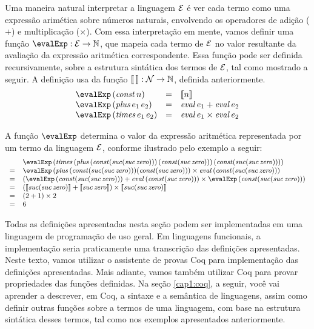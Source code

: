 \begin{Definition}\label{def:sem:Exp}
Uma maneira natural interpretar a linguagem $\mathcal{E}$ é ver cada termo como uma  expressão arimética sobre números naturais, envolvendo os operadores de adição ($+$) e multiplicação ($\times$). Com essa interpretação em mente, vamos definir uma função $\evalExp : \TExp \rightarrow \mathbb{N}$, que mapeia cada termo de $\mathcal{E}$ no valor resultante da avaliação da expressão aritmética correspondente. Essa função pode ser definida recursivamente, sobre a estrutura sintática dos termos de $\mathcal{E}$, tal como mostrado a seguir. A definição usa da função  $\llbracket\,\rrbracket : \mathcal{N} \rightarrow \mathbb{N}$, definida anteriormente.
\[
\begin{array}{lcl}
\evalExp\, (\tconst\, n)  & = & \llbracket n \rrbracket \\
\evalExp\, (\tplus\,e_1\,e_2) & = & \eval\,e_1 + \eval\,e_2 \\
\evalExp\, (\ttimes\,e_1\,e_2) & = & \eval\,e_1 \times \eval\,e_2 \\
\end{array}
\]
\end{Definition}
A função $\evalExp$ determina o valor da expressão aritmética representada por um termo da linguagem $\mathcal{E}$, conforme ilustrado pelo exemplo a seguir:
\[ \small{
\begin{array}{ll}
&\evalExp\, (\ttimes\,(\tplus\,(\tconst (\suc (\suc\,\zero)))\, (\tconst (\suc\,\zero)))\, (\tconst (\suc (\suc\,\zero)))) \\
= & \evalExp\, (\tplus\,(\tconst (\suc (\suc\,\zero))) (\tconst (\suc\,\zero))) \times \eval\, (\tconst (\suc (\suc\, \zero)))  \\
=  & (\evalExp\, (\tconst (\suc (\suc\,\zero))) + \eval\,  (\tconst (\suc\,\zero))) \times \evalExp\, (\tconst (\suc (\suc\, \zero))) \\
=  & (\llbracket \suc (\suc\,\zero) \rrbracket + \llbracket  \suc\,\zero \rrbracket) \times \llbracket \suc (\suc\,\zero) \rrbracket \\
=  & (2 + 1) \times 2 \\
= & 6 
\end{array}}
\]

Todas as defini\c{c}\~oes apresentadas nesta se\c{c}\~ao podem ser implementadas em uma linguagem de programação de uso geral. Em linguagens funcionais, a implementação seria praticamente uma transcrição das definições apresentadas. Neste texto, vamos utilizar o assistente de provas Coq para implementação das definições apresentadas. Mais adiante, vamos também utilizar Coq para provar propriedades das funções definidas. 
Na se\c{c}\~ao \ref{cap1:coq}, a seguir, você vai aprender a descrever, em Coq, a sintaxe e a semântica de linguagens, assim como definir outras funções sobre a termos de uma linguagem, com base na estrutura sint\'atica desses termos, tal como nos exemplos apresentados anteriormente.

